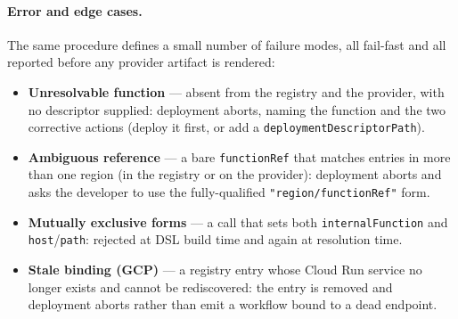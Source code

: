 \paragraph{Error and edge cases.}
The same procedure defines a small number of failure modes, all fail-fast and all reported before
any provider artifact is rendered:
\begin{itemize}
  \item \textbf{Unresolvable function} --- absent from the registry and the provider, with no
  descriptor supplied: deployment aborts, naming the function and the two corrective actions
  (deploy it first, or add a \texttt{deploymentDescriptorPath}).
  \item \textbf{Ambiguous reference} --- a bare \texttt{functionRef} that matches entries in more
  than one region (in the registry or on the provider): deployment aborts and asks the developer to
  use the fully-qualified \texttt{"region/functionRef"} form.
  \item \textbf{Mutually exclusive forms} --- a call that sets both \texttt{internalFunction} and
  \texttt{host}/\texttt{path}: rejected at DSL build time and again at resolution time.
  \item \textbf{Stale binding (GCP)} --- a registry entry whose Cloud Run service no longer exists
  and cannot be rediscovered: the entry is removed and deployment aborts rather than emit a
  workflow bound to a dead endpoint.
\end{itemize}












